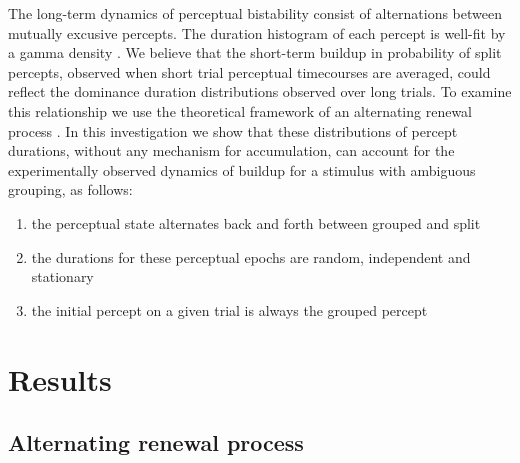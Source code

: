 \documentclass[10pt]{article}
\begin{document}
 


The long-term dynamics of perceptual bistability consist of alternations between mutually excusive percepts. The duration histogram of each percept is well-fit by a gamma density \cite{Shpiro2009, Pressnitzer2006}. We believe that the short-term buildup in probability of split percepts, observed when short trial perceptual timecourses are averaged, could reflect the dominance duration distributions observed over long trials. To examine this relationship we use the theoretical framework of an alternating renewal process \cite{}. In this investigation we show that these distributions of percept durations, without any mechanism for accumulation, can account for the experimentally observed dynamics of buildup for a stimulus with ambiguous grouping, as follows:

\begin{enumerate}
\item the perceptual state alternates back and forth between grouped and split
\item the durations for these perceptual epochs are random, independent and stationary
\item the initial percept on a given trial is always the grouped percept
\end{enumerate}



\section*{Results}
\subsection*{Alternating renewal process}
\end{document}
